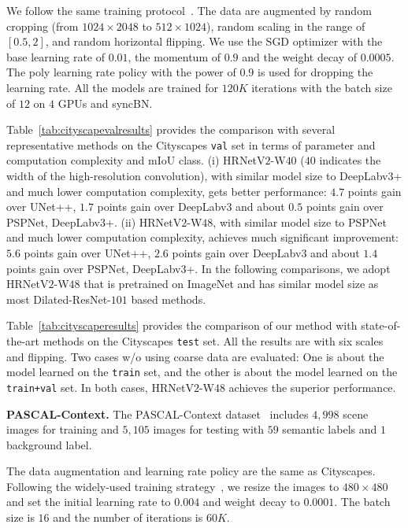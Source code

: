 \documentclass[10pt,journal,compsoc]{IEEEtran}
\begin{document}
We follow the same training protocol~\cite{ZhaoSQWJ17, ZhaoZLSLLJ18}.
The data are augmented by random cropping (from $1024\times2048$ to $512\times1024$), random scaling in the range of $[0.5, 2]$, and random horizontal flipping. We use the SGD optimizer with the base learning rate of $0.01$, 
the momentum of $0.9$ and the weight decay of $0.0005$. The poly learning rate policy with the power of $0.9$ is used for dropping the learning rate. All the models are trained for $120K$ iterations with the batch size of $12$ on $4$ GPUs and syncBN.




	

Table~\ref{tab:cityscapevalresults} provides the comparison with several representative methods 
on the Cityscapes \texttt{val} set
in terms of parameter and computation complexity and mIoU class. 
(i) HRNetV$2$-W$40$ ($40$ indicates the width of the high-resolution convolution), with similar model size to DeepLabv$3$+
and much lower computation complexity, gets better performance:
$4.7$ points gain over UNet++, $1.7$ points gain over DeepLabv3
and about $0.5$ points gain over PSPNet, DeepLabv3+. 
(ii) HRNetV$2$-W$48$, with similar model size to PSPNet and much lower computation complexity, achieves much significant improvement: 
$5.6$ points gain over UNet++, $2.6$ points gain over DeepLabv3
and about $1.4$ points gain over PSPNet, DeepLabv3+. 
In the following comparisons,
we adopt HRNetV$2$-W$48$ 
that is pretrained on ImageNet
and has similar model size 
as most Dilated-ResNet-$101$ based methods. 

Table~\ref{tab:cityscaperesults} provides the comparison of our method 
with state-of-the-art methods on the Cityscapes \texttt{test} set.
All the results are with six scales and flipping.
Two cases w/o using coarse data are evaluated:
One is about the model learned
on the \texttt{train} set,
and the other is about the model
learned on the \texttt{train+val} set.
In both cases, 
HRNetV$2$-W$48$ achieves the superior performance. %
	
	
	
\vspace{.1cm}
\noindent\textbf{PASCAL-Context.}
The PASCAL-Context dataset~\cite{MottaghiCLCLFUY14} 
includes $4,998$ scene images for training and 
$5,105$ images for testing with $59$ semantic labels and $1$ background label. 

The data augmentation and learning rate policy are the same as Cityscapes. 
Following the widely-used training strategy~\cite{0005DSZWTA18, DingJSL018}, 
we resize the images to $480\times480$ and set the initial learning rate to $0.004$ 
and weight decay to $0.0001$. The batch size is $16$ and the number of iterations is $60K$.
\end{document}
